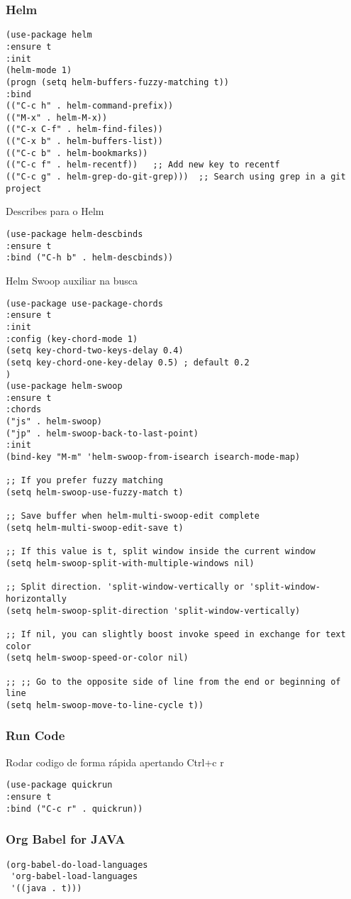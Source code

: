 \documentclass[11pt]{article}
\begin{document}
\subsubsection{Helm}
\label{sec:org4e6b978}
\begin{verbatim}
(use-package helm
:ensure t
:init 
(helm-mode 1)
(progn (setq helm-buffers-fuzzy-matching t))
:bind
(("C-c h" . helm-command-prefix))
(("M-x" . helm-M-x))
(("C-x C-f" . helm-find-files))
(("C-x b" . helm-buffers-list))
(("C-c b" . helm-bookmarks))
(("C-c f" . helm-recentf))   ;; Add new key to recentf
(("C-c g" . helm-grep-do-git-grep)))  ;; Search using grep in a git project
\end{verbatim}

Describes para o Helm
\begin{verbatim}
(use-package helm-descbinds
:ensure t
:bind ("C-h b" . helm-descbinds))
\end{verbatim}

Helm Swoop auxiliar na busca
\begin{verbatim}
(use-package use-package-chords
:ensure t
:init 
:config (key-chord-mode 1)
(setq key-chord-two-keys-delay 0.4)
(setq key-chord-one-key-delay 0.5) ; default 0.2
)
(use-package helm-swoop 
:ensure t
:chords
("js" . helm-swoop)
("jp" . helm-swoop-back-to-last-point)
:init
(bind-key "M-m" 'helm-swoop-from-isearch isearch-mode-map)

;; If you prefer fuzzy matching
(setq helm-swoop-use-fuzzy-match t)

;; Save buffer when helm-multi-swoop-edit complete
(setq helm-multi-swoop-edit-save t)

;; If this value is t, split window inside the current window
(setq helm-swoop-split-with-multiple-windows nil)

;; Split direction. 'split-window-vertically or 'split-window-horizontally
(setq helm-swoop-split-direction 'split-window-vertically)

;; If nil, you can slightly boost invoke speed in exchange for text color
(setq helm-swoop-speed-or-color nil)

;; ;; Go to the opposite side of line from the end or beginning of line
(setq helm-swoop-move-to-line-cycle t))
\end{verbatim}

\subsubsection{Run Code}
\label{sec:orgae2217d}
Rodar codigo de forma rápida apertando Ctrl+c r
\begin{verbatim}
(use-package quickrun 
:ensure t
:bind ("C-c r" . quickrun))
\end{verbatim}

\subsubsection{Org Babel for JAVA}
\label{sec:org3fb6445}
\begin{verbatim}
(org-babel-do-load-languages
 'org-babel-load-languages
 '((java . t)))
\end{verbatim}
\end{document}
